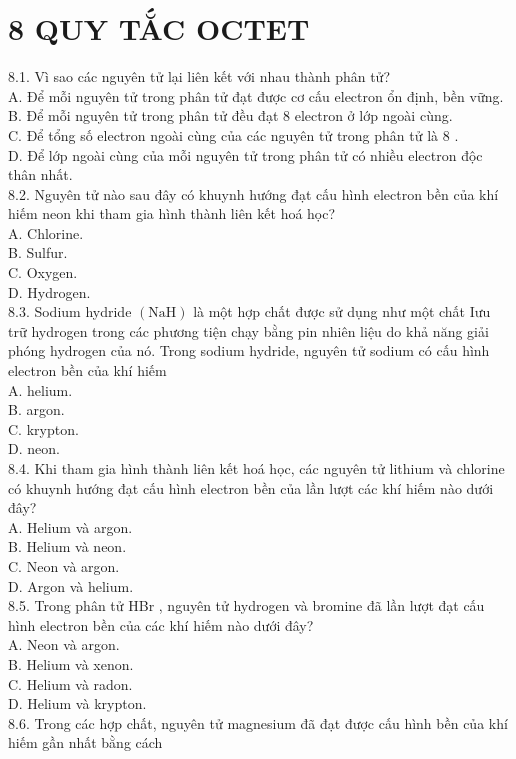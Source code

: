 \documentclass[10pt]{article}
\begin{document}
\section*{8 QUY TẮC OCTET}
8.1. Vì sao các nguyên tử lại liên kết với nhau thành phân tử?\\
A. Để mỗi nguyên tử trong phân tử đạt được cơ cấu electron ổn định, bền vững.\\
B. Để mỗi nguyên tử trong phân tử đều đạt 8 electron ở lớp ngoài cùng.\\
C. Để tổng số electron ngoài cùng của các nguyên tử trong phân tử là 8 .\\
D. Để lớp ngoài cùng của mỗi nguyên tử trong phân tử có nhiều electron độc thân nhất.\\
8.2. Nguyên tử nào sau đây có khuynh hướng đạt cấu hình electron bền của khí hiếm neon khi tham gia hình thành liên kết hoá học?\\
A. Chlorine.\\
B. Sulfur.\\
C. Oxygen.\\
D. Hydrogen.\\
8.3. Sodium hydride $(\mathrm{NaH})$ là một hợp chất được sử dụng như một chất Iưu trữ hydrogen trong các phương tiện chạy bằng pin nhiên liệu do khả năng giải phóng hydrogen của nó. Trong sodium hydride, nguyên tử sodium có cấu hình electron bền của khí hiếm\\
A. helium.\\
B. argon.\\
C. krypton.\\
D. neon.\\
8.4. Khi tham gia hình thành liên kết hoá học, các nguyên tử lithium và chlorine có khuynh hướng đạt cấu hình electron bền của lần lượt các khí hiếm nào dưới đây?\\
A. Helium và argon.\\
B. Helium và neon.\\
C. Neon và argon.\\
D. Argon và helium.\\
8.5. Trong phân tử HBr , nguyên tử hydrogen và bromine đã lần lượt đạt cấu hình electron bền của các khí hiếm nào dưới đây?\\
A. Neon và argon.\\
B. Helium và xenon.\\
C. Helium và radon.\\
D. Helium và krypton.\\
8.6. Trong các hợp chất, nguyên tử magnesium đã đạt được cấu hình bền của khí hiếm gần nhất bằng cách\\
\end{document}

